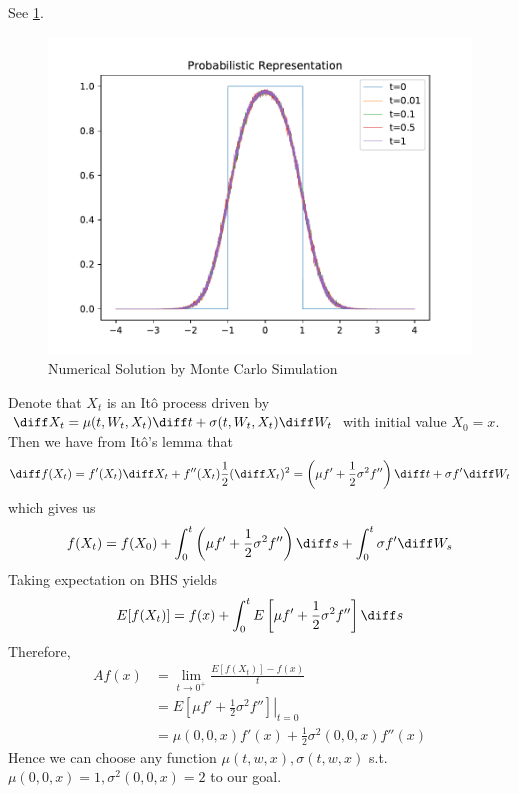 \begin{subproblem}
    \item
    See \cref{fig:prob sol}.
    \begin{figure}[h]
        \centering
        \includegraphics[width=\textwidth]{prob-sol}
        \caption{Numerical Solution by Monte Carlo Simulation}
        \label{fig:prob sol}
    \end{figure}
\end{subproblem}

\problem
Denote that $X_t$ is an It\^o process
 driven by $\diff X_t=\mu(t,W_t,X_t)\diff t+\sigma(t,W_t,X_t)\diff W_t$
with initial value $X_0=x$.
Then we have from It\^o's lemma
that
\[\diff f(X_t)=f'(X_t)\diff X_t+f''(X_t)\frac{1}{2}(\diff X_t)^2
=\left(\mu f'+\frac{1}{2}\sigma^2 f''\right)\diff t+\sigma f'\diff W_t\]
which gives us
\[f(X_t)=f(X_0)+\int_0^t\left(\mu f'+\frac{1}{2}\sigma^2 f''\right)\diff s
+\int_0^t\sigma f'\diff W_s\]
Taking expectation on BHS yields
\[E[f(X_t)]=f(x)+\int_0^tE\left[\mu f'+\frac{1}{2}\sigma^2 f''\right]\diff s\]
Therefore,
\[\begin{aligned}
    Af(x)&=\lim_{t\to 0^+}\frac{E[f(X_t)]-f(x)}{t}\\
    &=\left.E\left[\mu f'+\frac{1}{2}\sigma^2 f''\right]\right|_{t=0}\\
    &=\mu(0,0,x) f'(x)+\frac{1}{2}\sigma^2(0,0,x) f''(x)
\end{aligned}\]
Hence we can choose any function $\mu(t,w,x),\sigma(t,w,x)$
s.t. $\mu(0,0,x)=1,\sigma^2(0,0,x)=2$ to
our goal.

